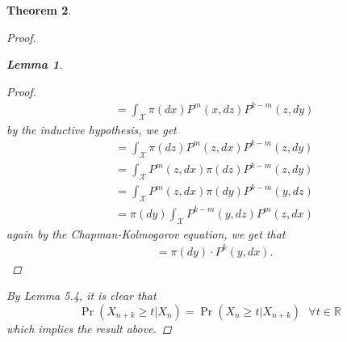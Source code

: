 \documentclass{article}
\newtheorem{theorem}{Theorem}[section]
\newtheorem{lemma}[theorem]{Lemma}
\begin{document}
\begin{theorem}
\begin{proof}
\begin{lemma}
\begin{proof}
\begin{align*}
						&= \int_{\mathcal{X}} \pi(dx) P^m(x, dz) P^{k-m}(z, dy)
					\end{align*}
					by the inductive hypothesis, we get
					\begin{align*}
						&= \int_{\mathcal{X}} \pi(dz) P^m(z, dx) P^{k-m}(z, dy) \\
						&= \int_{\mathcal{X}} P^m(z, dx) \pi(dz) P^{k-m}(z, dy) \\
						&= \int_{\mathcal{X}} P^m(z, dx) \pi(dy) P^{k-m}(y, dz) \\
						&= \pi(dy) \int_{\mathcal{X}}  P^{k-m}(y, dz) P^m(z, dx)
					\end{align*}
					again by the Chapman-Kolmogorov equation, we get that
					\begin{align*}
						&= \pi(dy) \cdot P^k(y, dx).
					\end{align*}
				\end{proof}
			\end{lemma}
			By Lemma 5.4, it is clear that
			\begin{equation*}
				\Pr (X_{n+k} \geq t | X_n) = \Pr (X_n \geq t | X_{n+k}) \text{  } \forall t \in \mathbb{R}
			\end{equation*}
			which implies the result above.
		\end{proof}
	\end{theorem}
\end{document}
